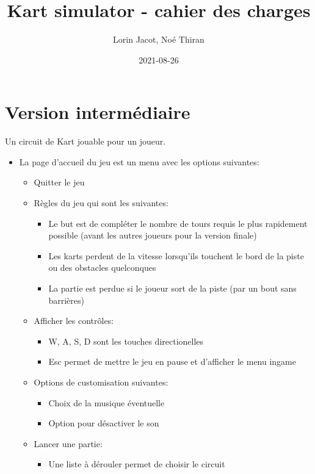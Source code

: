 \documentclass{article}
\title{Kart simulator - cahier des charges}
\date{2021-08-26}
\author{Lorin Jacot, Noé Thiran}
\begin{document}
\maketitle

\section{Version intermédiaire}

Un circuit de Kart jouable pour un joueur.
\begin{itemize}
    \item La page d'accueil du jeu est un menu avec les options suivantes: \begin{itemize}
              \item Quitter le jeu
              \item Règles du jeu qui sont les suivantes: \begin{itemize}
                        \item Le but est de compléter le nombre de tours requis le plus rapidement possible (avant les autres joueurs pour la version finale)
                        \item Les karts perdent de la vitesse lorsqu'ils touchent le bord de la piste ou des obstacles quelconques
                        \item La partie est perdue si le joueur sort de la piste (par un bout sans barrières)
                    \end{itemize}
              \item Afficher les contrôles: \begin{itemize}
                        \item W, A, S, D sont les touches directionelles
                        \item Esc permet de mettre le jeu en pause et d'afficher le menu ingame
                    \end{itemize}
              \item Options de customisation suivantes: \begin{itemize}
                        \item Choix de la musique éventuelle
                        \item Option pour désactiver le son
                    \end{itemize}
              \item Lancer une partie: \begin{itemize}
                        \item Une liste à dérouler permet de choisir le circuit

\end{itemize}
\end{itemize}
\end{itemize}
\end{document}
